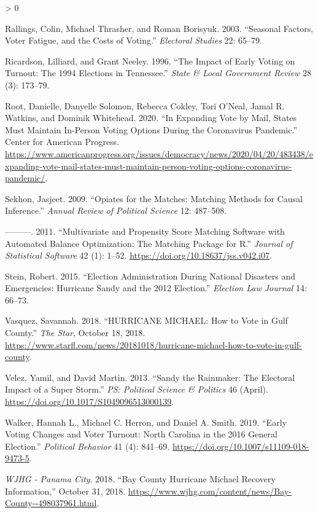 \documentclass[
  12pt,
]{article}
\newlength{\cslhangindent}
\newenvironment{CSLReferences}[2] %
 {%
  \setlength{\parindent}{0pt}
  \ifodd #1 \everypar{\setlength{\hangindent}{\cslhangindent}}\ignorespaces\fi
  \ifnum #2 > 0
  \setlength{\parskip}{#2\baselineskip}
  \fi
 }%
 {}
\begin{document}
\begin{CSLReferences}{1}{0}
\leavevmode\hypertarget{ref-Rallings2003}{}%
Rallings, Colin, Michael Thrasher, and Roman Borisyuk. 2003. {``Seasonal {Factors}, Voter Fatigue, and the Costs of Voting.''} \emph{Electoral Studies} 22: 65--79.

\leavevmode\hypertarget{ref-Ricardson1996}{}%
Ricardson, Lilliard, and Grant Neeley. 1996. {``The {Impact} of {Early Voting} on {Turnout}: The 1994 {Elections} in {Tennessee}.''} \emph{State \& Local Government Review} 28 (3): 173--79.

\leavevmode\hypertarget{ref-Root2020}{}%
Root, Danielle, Danyelle Solomon, Rebecca Cokley, Tori O'Neal, Jamal R. Watkins, and Dominik Whitehead. 2020. {``In {Expanding Vote} by {Mail}, {States Must Maintain In}-{Person Voting Options During} the {Coronavirus Pandemic}.''} {Center for American Progress}. \url{https://www.americanprogress.org/issues/democracy/news/2020/04/20/483438/expanding-vote-mail-states-must-maintain-person-voting-options-coronavirus-pandemic/}.

\leavevmode\hypertarget{ref-Sekhon2009}{}%
Sekhon, Jasjeet. 2009. {``Opiates for the {Matches}: Matching {Methods} for {Causal Inference}.''} \emph{Annual Review of Political Science} 12: 487--508.

\leavevmode\hypertarget{ref-Sekhon2011}{}%
---------. 2011. {``Multivariate and {Propensity Score Matching Software} with {Automated Balance Optimization}: The {Matching} Package for {R}.''} \emph{Journal of Statistical Software} 42 (1): 1--52. \url{https://doi.org/10.18637/jss.v042.i07}.

\leavevmode\hypertarget{ref-Stein2015}{}%
Stein, Robert. 2015. {``Election {Administration During National Disasters} and {Emergencies}: Hurricane {Sandy} and the 2012 {Election}.''} \emph{Election Law Journal} 14: 66--73.

\leavevmode\hypertarget{ref-Vasquez2018}{}%
Vasquez, Savannah. 2018. {``{HURRICANE MICHAEL}: How to Vote in {Gulf County}.''} \emph{The Star}, October 18, 2018. \url{https://www.starfl.com/news/20181018/hurricane-michael-how-to-vote-in-gulf-county}.

\leavevmode\hypertarget{ref-Velez2013}{}%
Velez, Yamil, and David Martin. 2013. {``Sandy the {Rainmaker}: The {Electoral Impact} of a {Super Storm}.''} \emph{PS: Political Science \& Politics} 46 (April). \url{https://doi.org/10.1017/S1049096513000139}.

\leavevmode\hypertarget{ref-Walker2019}{}%
Walker, Hannah L., Michael C. Herron, and Daniel A. Smith. 2019. {``Early {Voting Changes} and {Voter Turnout}: North {Carolina} in the 2016 {General Election}.''} \emph{Political Behavior} 41 (4): 841--69. \url{https://doi.org/10.1007/s11109-018-9473-5}.

\leavevmode\hypertarget{ref-WJHG2018}{}%
\emph{WJHG - Panama City}. 2018. {``Bay {County Hurricane Michael Recovery Information},''} October 31, 2018. \url{https://www.wjhg.com/content/news/Bay-County--498037961.html}.

\end{CSLReferences}
\end{document}
